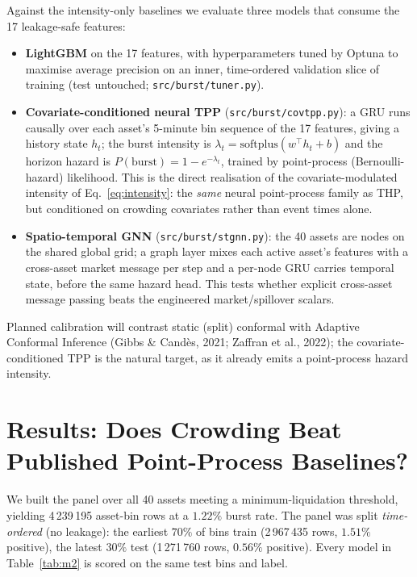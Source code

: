 \documentclass[11pt,a4paper]{article}
\begin{document}
Against the intensity-only baselines we evaluate three models that consume the 17 leakage-safe features:

\begin{itemize}[nosep]
    \item \textbf{LightGBM} on the 17 features, with hyperparameters tuned by Optuna to maximise average precision on an inner, time-ordered validation slice of training (test untouched; \texttt{src/burst/tuner.py}).
    \item \textbf{Covariate-conditioned neural TPP} (\texttt{src/burst/covtpp.py}): a GRU runs causally over each asset's 5-minute bin sequence of the 17 features, giving a history state $h_t$; the burst intensity is $\lambda_t=\text{softplus}(w^\top h_t + b)$ and the horizon hazard is $P(\text{burst})=1-e^{-\lambda_t}$, trained by point-process (Bernoulli-hazard) likelihood. This is the direct realisation of the covariate-modulated intensity of Eq.~\eqref{eq:intensity}: the \emph{same} neural point-process family as THP, but conditioned on crowding covariates rather than event times alone.
    \item \textbf{Spatio-temporal GNN} (\texttt{src/burst/stgnn.py}): the 40 assets are nodes on the shared global grid; a graph layer mixes each active asset's features with a cross-asset market message per step and a per-node GRU carries temporal state, before the same hazard head. This tests whether explicit cross-asset message passing beats the engineered market/spillover scalars.
\end{itemize}

Planned calibration will contrast static (split) conformal with Adaptive Conformal Inference (Gibbs \& Cand\`es, 2021; Zaffran et al., 2022); the covariate-conditioned TPP is the natural target, as it already emits a point-process hazard intensity.

\section{Results: Does Crowding Beat Published Point-Process Baselines?}
\label{sec:results}

We built the panel over all 40 assets meeting a minimum-liquidation threshold, yielding 4\,239\,195 asset-bin rows at a $1.22\%$ burst rate. The panel was split \emph{time-ordered} (no leakage): the earliest $70\%$ of bins train (2\,967\,435 rows, $1.51\%$ positive), the latest $30\%$ test (1\,271\,760 rows, $0.56\%$ positive). Every model in Table~\ref{tab:m2} is scored on the same test bins and label.
\end{document}
